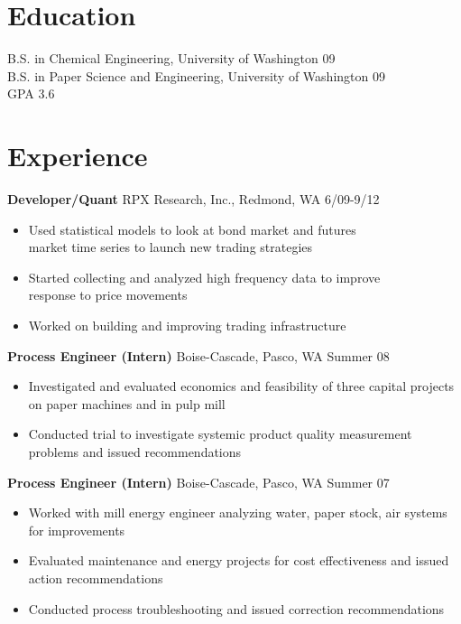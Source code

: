 \documentclass[margin]{res}
\begin{document}
 
 
 
\begin{resume} 
 
\section{Education} 
B.S. in Chemical Engineering, University of Washington 09 \\
B.S. in Paper Science and Engineering, University of Washington 09\\
GPA 3.6 
 
\section{Experience}
  {\bf Developer/Quant} RPX Research, Inc., Redmond, WA \hfill 6/09-9/12
   \begin{itemize} \itemsep -2pt  %
     \item Used statistical models to look at bond market and futures \\
       market time series to launch new trading strategies 
     \item Started collecting and analyzed high frequency data to improve \\
       response to price movements
     \item Worked on building and improving trading infrastructure
   \end{itemize}



  {\bf Process Engineer (Intern)} Boise-Cascade, Pasco, WA \hfill  Summer 08
  \begin{itemize} \itemsep -2pt %
    \item Investigated and evaluated economics and feasibility of three capital projects on paper machines and in pulp mill 
    \item Conducted trial to investigate systemic product quality measurement problems and issued recommendations 
  \end{itemize}

  {\bf Process Engineer (Intern)} Boise-Cascade, Pasco, WA \hfill  Summer 07
  \begin{itemize} \itemsep -2pt
    \item Worked with mill energy engineer analyzing water, paper stock, air systems for improvements 
    \item Evaluated maintenance and energy projects for cost effectiveness and issued action recommendations 
    \item Conducted process troubleshooting and issued correction recommendations
   \end{itemize}


\end{resume}
\end{document}
